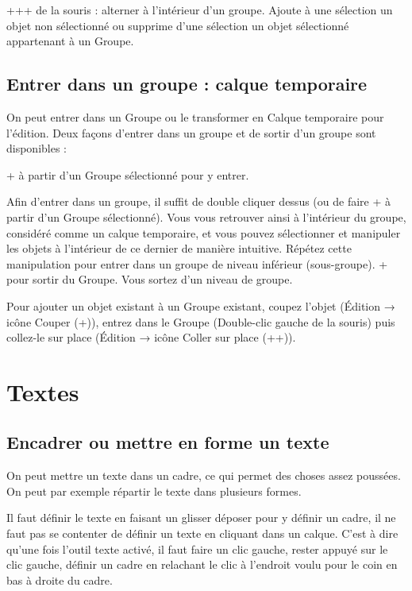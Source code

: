 \documentclass[a4paper,twoside]{article}
\begin{document}
+++ de la souris : alterner à l'intérieur d'un groupe. Ajoute à une sélection un objet non sélectionné ou supprime d'une sélection un objet sélectionné appartenant à un Groupe. 

\subsection{Entrer dans un groupe : calque temporaire}
On peut entrer dans un Groupe ou le transformer en Calque temporaire pour l'édition. Deux façons d'entrer dans un groupe et de sortir d'un groupe sont disponibles :

+ à partir d'un Groupe sélectionné pour y entrer. 

Afin d'entrer dans un groupe, il suffit de double cliquer dessus (ou de faire + à partir d'un Groupe sélectionné).  Vous vous retrouver ainsi à l'intérieur du groupe, considéré comme un calque temporaire, et vous pouvez sélectionner et manipuler les objets à l'intérieur de ce dernier de manière intuitive. Répétez cette manipulation pour entrer dans un groupe de niveau inférieur (sous-groupe). + pour sortir du Groupe. Vous sortez d'un niveau de groupe.

\begin{remarque}
Pour ajouter un objet existant à un Groupe existant, coupez l'objet (Édition → icône Couper (+)), entrez dans le Groupe (Double-clic gauche de la souris) puis collez-le sur place (Édition → icône Coller sur place (++)). 
\end{remarque}


\section{Textes}
\subsection{Encadrer ou mettre en forme un texte}
On peut mettre un texte dans un cadre, ce qui permet des choses assez poussées. On peut par exemple répartir le texte dans plusieurs formes. 

\begin{attention}
Il faut définir le texte en faisant un glisser déposer pour y définir un cadre, il ne faut pas se contenter de définir un texte en cliquant dans un calque. C'est à dire qu'une fois l'outil texte activé, il faut faire un clic gauche, rester appuyé sur le clic gauche, définir un cadre en relachant le clic à l'endroit voulu pour le coin en bas à droite du cadre. 
\end{attention}
\end{document}
